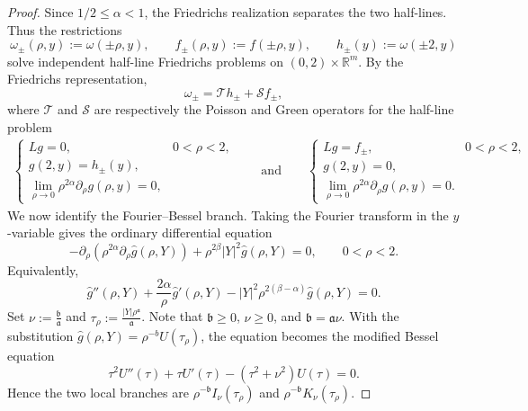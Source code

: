 \documentclass[12pt]{amsart}
\begin{document}
\begin{proof}
Since $1/2\le \alpha<1$, the Friedrichs realization separates the two half-lines. Thus the restrictions
\begin{equation*}
    \omega_\pm(\rho,y):=\omega(\pm\rho,y),
    \qquad
    f_\pm(\rho,y):=f(\pm\rho,y),
    \qquad
    h_\pm(y):=\omega(\pm2,y)
\end{equation*}
solve independent half-line Friedrichs problems on $(0,2)\times\mathbb R^m$.
By the Friedrichs representation,
\begin{equation*}
    \omega_\pm=\mathcal T h_\pm+ \mathcal S f_\pm,
\end{equation*}
where $\mathcal T$ and $\mathcal S$ are respectively the Poisson and Green operators for the half-line problem
\begin{align*}
\begin{cases}
    Lg=0, & 0<\rho<2,\\
    g(2,y)=h_\pm(y),\\
    \displaystyle \lim_{\rho\to0}\rho^{2\alpha}\partial_\rho g(\rho,y)=0,
\end{cases}\qquad \mathrm{and}\qquad \begin{cases}
    Lg=f_\pm, & 0<\rho<2,\\
    g(2,y)=0,\\
    \displaystyle \lim_{\rho\to 0}\rho^{2\alpha}\partial_\rho g(\rho,y)=0.
\end{cases}   
\end{align*}
We now identify the Fourier--Bessel branch. Taking the Fourier transform in
the $y$-variable gives the ordinary differential equation
\begin{equation*}
-\partial_\rho\left(\rho^{2\alpha}\partial_\rho \hat g(\rho,Y)\right)+\rho^{2\beta}|Y|^2\hat g(\rho,Y)=0,\qquad 0<\rho<2.
\end{equation*}
Equivalently,
\begin{equation*}
\hat g''(\rho,Y)+\frac{2\alpha}{\rho}\hat g'(\rho,Y)-|Y|^2\rho^{2(\beta-\alpha)}\hat g(\rho,Y)=0.
\end{equation*}
Set $\nu:=\frac{\mathfrak b}{\mathfrak a}$ and $\tau_\rho:=\frac{|Y|\rho^\mathfrak a}{\mathfrak a}$. Note that $\mathfrak b\ge 0$, $\nu\ge 0$, and $\mathfrak b=\mathfrak a \nu$. With the substitution $\hat g(\rho,Y)=\rho^{-b}U(\tau_\rho)$, the equation becomes the modified Bessel equation
\begin{equation*}
    \tau^2U''(\tau)+\tau U'(\tau)-(\tau^2+\nu^2)U(\tau)=0.
\end{equation*}
Hence the two local branches are $\rho^{-\mathfrak b}I_\nu(\tau_\rho)$ and $\rho^{-\mathfrak b}K_\nu(\tau_\rho)$.


\end{proof}
\end{document}
